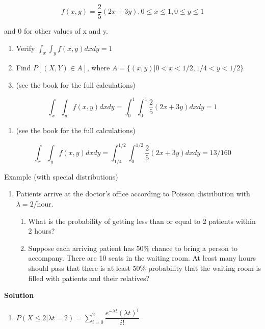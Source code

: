 \documentclass[]{book}
\providecommand{\tightlist}{%
  \setlength{\itemsep}{0pt}\setlength{\parskip}{0pt}}
\theoremstyle{definition}
\theoremstyle{definition}
\theoremstyle{definition}
\theoremstyle{remark}
\begin{document}
\[
f(x,y) = \dfrac{2}{5}(2x + 3y), 0 \le x \le 1, 0 \le y \le 1
\]

and 0 for other values of x and y.

\begin{enumerate}
\def\labelenumi{(\alph{enumi})}
\item
  Verify \(\int_x \int_y f(x,y) dx dy = 1\)
\item
  Find \(P[(X,Y) \in A]\), where
  \(A = \{(x,y)|0 < x < 1/2, 1/4 < y < 1/2\}\)
\item
  (see the book for the full calculations)
\end{enumerate}

\[
\int_x \int_y f(x,y) dx dy = \int_0^1 \int_0^1 \dfrac{2}{5}(2x+3y) dx dy = 1
\]

\begin{enumerate}
\def\labelenumi{(\alph{enumi})}
\tightlist
\item
  (see the book for the full calculations)
\end{enumerate}

\[
\int_x \int_y f(x,y) dx dy = \int_{1/4}^{1/2} \int_0^{1/2} \dfrac{2}{5}(2x+3y) dx dy = 13/160
\]

Example (with special distributions)

\begin{enumerate}
\def\labelenumi{\arabic{enumi}.}
\item
  Patients arrive at the doctor's office according to Poisson
  distribution with \(\lambda = 2\)/hour.

  \begin{enumerate}
  \def\labelenumii{\alph{enumii})}
  \tightlist
  \item
    What is the probability of getting less than or equal to 2 patients
    within 2 hours?
  \item
    Suppose each arriving patient has 50\% chance to bring a person to
    accompany. There are 10 seats in the waiting room. At least many
    hours should pass that there is at least 50\% probability that the
    waiting room is filled with patients and their relatives?
  \end{enumerate}
\end{enumerate}

\textbf{Solution}

\begin{enumerate}
\def\labelenumi{\alph{enumi})}
\tightlist
\item
  \(P(X\le 2|\lambda t = 2)= \sum_{i=0}^2 \dfrac{e^{-\lambda t}(\lambda t)^i}{i!}\)
\end{enumerate}
\end{document}
